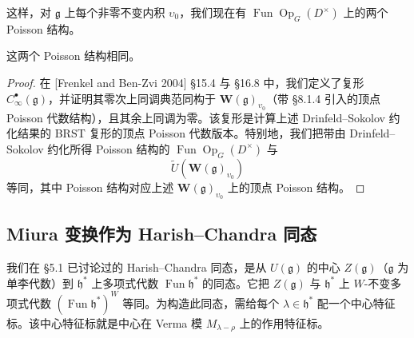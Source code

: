 这样，对 $\mathfrak g$ 上每个非零不变内积 $\upsilon_0$，我们现在有 $\operatorname{Fun}\operatorname{Op}_G(D^\times)$ 上的两个 Poisson 结构。

\begin{lemma}
    这两个 Poisson 结构相同。
\end{lemma}

\begin{proof}
在 [Frenkel and Ben-Zvi 2004] §15.4 与 §16.8 中，我们定义了复形 $C^\bullet_\infty(\mathfrak g)$，并证明其零次上同调典范同构于 $\mathbf W(\mathfrak g)_{\upsilon_0}$（带 §8.1.4 引入的顶点 Poisson 代数结构），且其余上同调为零。该复形是计算上述 Drinfeld–Sokolov 约化结果的 BRST 复形的顶点 Poisson 代数版本。特别地，我们把带由 Drinfeld–Sokolov 约化所得 Poisson 结构的 $\operatorname{Fun}\operatorname{Op}_G(D^\times)$ 与
\[
    \widetilde U(\mathbf W(\mathfrak g)_{\upsilon_0})
\]
等同，其中 Poisson 结构对应上述 $\mathbf W(\mathfrak g)_{\upsilon_0}$ 上的顶点 Poisson 结构。
\end{proof}


\subsection{Miura 变换作为 Harish--Chandra 同态}

我们在 §5.1 已讨论过的 Harish--Chandra 同态，是从 $U(\mathfrak g)$ 的中心 $Z(\mathfrak g)$（$\mathfrak g$ 为单李代数）到 $\mathfrak h^*$ 上多项式代数 $\operatorname{Fun}\mathfrak h^*$ 的同态。它把 $Z(\mathfrak g)$ 与 $\mathfrak h^*$ 上 $W$-不变多项式代数 $(\operatorname{Fun}\mathfrak h^*)^W$ 等同。为构造此同态，需给每个 $\lambda\in\mathfrak h^*$ 配一个中心特征标。该中心特征标就是中心在 Verma 模 $M_{\lambda-\rho}$ 上的作用特征标。

